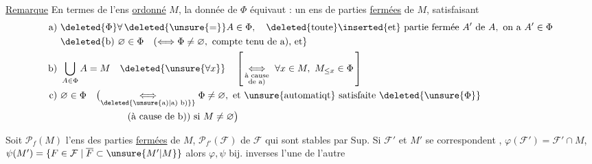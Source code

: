 \uline{Remarque}
En termes de l'ens \uline{ordonné} $M$, la donnée de $\Phi$ équivaut : un ens de parties \uline{fermées} de $M$, satisfaisant
\[
\begin{aligned}
\text{a) }&\deleted{\Phi}\forall\,\deleted{\unsure{=}}A\in\Phi,\quad
 \deleted{\text{toute}}\inserted{\text{et}}\ \text{partie fermée }A'\text{ de }A,\ \text{on a }A'\in\Phi\\
&\deleted{\text{b) }\varnothing\in\Phi\quad
 (\Longleftrightarrow\Phi\ne\varnothing,\ \text{compte tenu de a), et}}\\
\text{b) }&\bigcup_{A\in\Phi} A=M\quad\deleted{\unsure{\forall x}}\quad
 \left[\,\underset{\substack{\text{à cause}\\\text{de a)}}}{\Longleftrightarrow}\
 \forall x\in M,\ M_{\leq x}\in\Phi\,\right]\\
\text{c) }&\varnothing\in\Phi\quad
 \bigl(\underset{\deleted{\unsure{\text{a)}|\text{a) b)}}}}{\Longleftrightarrow}
 \Phi\ne\varnothing,\ \text{et \unsure{automatiqt} satisfaite}\ \deleted{\unsure{\Phi}}\\
 &\hspace{7em}\text{(à cause de b)) si }M\ne\varnothing\bigr)
\end{aligned}
\]

 Soit $\mathcal P_f(M)$ l'ens des parties \uline{fermées} de $M$, $\mathcal P_{f'}(\mathcal F)$ de $\mathcal F$ qui sont stables par Sup. Si $\mathcal F'$ et $M'$ se correspondent , 
\diagram{\fbox{\begin{tikzcd}[ampersand replacement=\&,column sep=large]
\mathcal P_f(\unsure{\mathcal F|M\mathcal F}) \arrow[r,shift left=.6ex,"\varphi"] \& \mathcal P_f(M) \arrow[l,shift left=.6ex,"\psi"]
\end{tikzcd}}}
$\varphi(\mathcal F')=\mathcal F'\cap M$, $\psi(M')=\{F\in\mathcal F\mid\overline F\subset \unsure{M'|M}\}$ alors $\varphi,\psi$ bij. inverses l'une de l'autre


